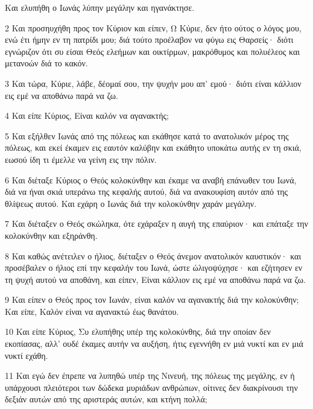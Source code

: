 \par Και ελυπήθη ο Ιωνάς λύπην μεγάλην και ηγανάκτησε.
\par 2 Και προσηυχήθη προς τον Κύριον και είπεν, Ω Κύριε, δεν ήτο ούτος ο λόγος μου, ενώ έτι ήμην εν τη πατρίδι μου; διά τούτο προέλαβον να φύγω εις Θαρσείς· διότι εγνώριζον ότι συ είσαι Θεός ελεήμων και οικτίρμων, μακρόθυμος και πολυέλεος και μετανοών διά το κακόν.
\par 3 Και τώρα, Κύριε, λάβε, δέομαί σου, την ψυχήν μου απ' εμού· διότι είναι κάλλιον εις εμέ να αποθάνω παρά να ζω.
\par 4 Και είπε Κύριος, Είναι καλόν να αγανακτής;
\par 5 Και εξήλθεν Ιωνάς από της πόλεως και εκάθησε κατά το ανατολικόν μέρος της πόλεως, και εκεί έκαμεν εις εαυτόν καλύβην και εκάθητο υποκάτω αυτής εν τη σκιά, εωσού ίδη τι έμελλε να γείνη εις την πόλιν.
\par 6 Και διέταξε Κύριος ο Θεός κολοκύνθην και έκαμε να αναβή επάνωθεν του Ιωνά, διά να ήναι σκιά υπεράνω της κεφαλής αυτού, διά να ανακουφίση αυτόν από της θλίψεως αυτού. Και εχάρη ο Ιωνάς διά την κολοκύνθην χαράν μεγάλην.
\par 7 Και διέταξεν ο Θεός σκώληκα, ότε εχάραξεν η αυγή της επαύριον· και επάταξε την κολοκύνθην και εξηράνθη.
\par 8 Και καθώς ανέτειλεν ο ήλιος, διέταξεν ο Θεός άνεμον ανατολικόν καυστικόν· και προσέβαλεν ο ήλιος επί την κεφαλήν του Ιωνά, ώστε ώλιγοψύχησε· και εζήτησεν εν τη ψυχή αυτού να αποθάνη, και είπεν, Είναι κάλλιον εις εμέ να αποθάνω παρά να ζω.
\par 9 Και είπεν ο Θεός προς τον Ιωνάν, είναι καλόν να αγανακτής διά την κολοκύνθην; Και είπε, Καλόν είναι να αγανακτώ έως θανάτου.
\par 10 Και είπε Κύριος, Συ ελυπήθης υπέρ της κολοκύνθης, διά την οποίαν δεν εκοπίασας, αλλ' ουδέ έκαμες αυτήν να αυξήση, ήτις εγεννήθη εν μιά νυκτί και εν μιά νυκτί εχάθη.
\par 11 Και εγώ δεν έπρεπε να λυπηθώ υπέρ της Νινευή, της πόλεως της μεγάλης, εν ή υπάρχουσι πλειότεροι των δώδεκα μυριάδων ανθρώπων, οίτινες δεν διακρίνουσι την δεξιάν αυτών από της αριστεράς αυτών, και κτήνη πολλά;


